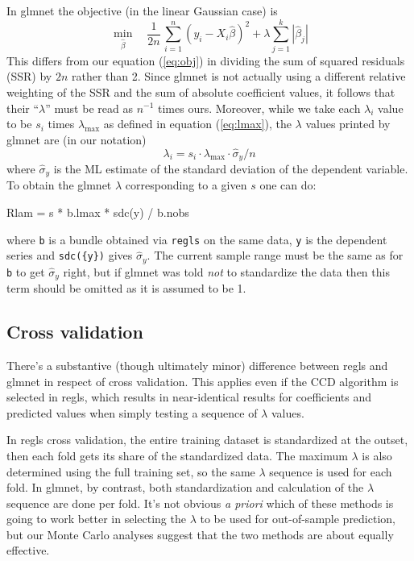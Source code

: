 \documentclass{article}
\begin{document}
In \textsf{glmnet} the objective (in the linear Gaussian case) is
\[
   \min_{\hat{\beta}} \quad \frac{1}{2n}\,
  \sum_{i=1}^n (y_i - X_i\hat{\beta})^2 + \lambda \sum_{j=1}^k |\hat{\beta}_j|
\]
This differs from our equation (\ref{eq:obj}) in dividing the sum of
squared residuals (SSR) by $2n$ rather than 2. Since \textsf{glmnet}
is not actually using a different relative weighting of the SSR and
the sum of absolute coefficient values, it follows that their
``$\lambda$'' must be read as $n^{-1}$ times ours. Moreover, while we
take each $\lambda_i$ value to be $s_i$ times $\lambda_{\max}$ as
defined in equation (\ref{eq:lmax}), the $\lambda$ values printed by
\textsf{glmnet} are (in our notation)
\[
\lambda_i = s_i \cdot \lambda_{\max} \cdot \hat{\sigma}_y / n
\]
where $\hat{\sigma}_y$ is the ML estimate of the standard deviation of
the dependent variable. To obtain the \textsf{glmnet} $\lambda$
corresponding to a given $s$ one can do:
\begin{code}
Rlam = s * b.lmax * sdc({y}) / b.nobs
\end{code}
where \texttt{b} is a bundle obtained via \texttt{regls} on the same
data, \texttt{y} is the dependent series and \texttt{sdc(\{y\})} gives
$\hat{\sigma}_y$. The current sample range must be the same as for
\texttt{b} to get $\hat{\sigma}_y$ right, but if \textsf{glmnet} was
told \textit{not} to standardize the data then this term should be
omitted as it is assumed to be 1.

\subsection*{Cross validation}

There's a substantive (though ultimately minor) difference between
\textsf{regls} and \textsf{glmnet} in respect of cross
validation. This applies even if the CCD algorithm is selected in
\textsf{regls}, which results in near-identical results for
coefficients and predicted values when simply testing a sequence of
$\lambda$ values.

In \textsf{regls} cross validation, the entire training dataset is
standardized at the outset, then each fold gets its share of the
standardized data. The maximum $\lambda$ is also determined using the
full training set, so the same $\lambda$ sequence is used for each
fold. In \textsf{glmnet}, by contrast, both standardization and
calculation of the $\lambda$ sequence are done per fold. It's not
obvious \textit{a priori} which of these methods is going to work
better in selecting the $\lambda$ to be used for out-of-sample
prediction, but our Monte Carlo analyses suggest that the two methods
are about equally effective.
\end{document}

